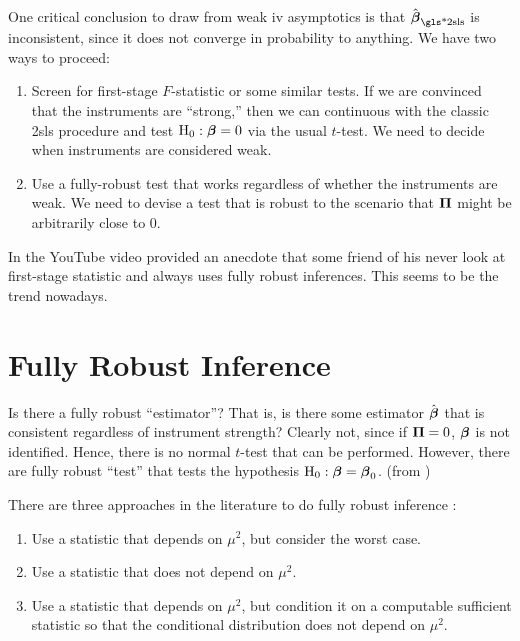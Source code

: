 \documentclass[a4paper]{article}
\begin{document}
\begin{remark}
	One critical conclusion to draw from weak \gls*{iv} asymptotics is that
	$\hat\bbeta_{\text{\gls*{2sls}}}$ is inconsistent, since
	it does not converge in probability to anything.
	We have two ways to proceed:
	\begin{enumerate}
		\item
			Screen for first-stage $F$-statistic or some similar tests.
			If we are convinced that the instruments are ``strong,''
			then we can continuous with the classic \gls*{2sls} procedure
			and test $\mathrm{H}_0:\boldsymbol{\beta}=0$ via the usual $t$-test.
			We need to decide when instruments are considered weak.
			\parencite{stock-yogo-2005}
		\item
			Use a fully-robust test that works regardless of whether the instruments are weak.
			We need to devise a test that is robust to the scenario that $\boldsymbol{\Pi}$ might be arbitrarily close to $0$.
	\end{enumerate}
	In the YouTube video \textcite{stock-2008} provided an anecdote
	that some friend of his never look at first-stage statistic and always uses fully robust inferences.
	This seems to be the trend nowadays.
\end{remark}

\section{Fully Robust Inference}

\begin{remark}
	Is there a fully robust ``estimator''?
	That is, is there some estimator $\hat{\boldsymbol{\beta}}$ that is consistent regardless of instrument strength?
	Clearly not, since if $\boldsymbol{\Pi}=0$, $\boldsymbol{\beta}$ is not identified.
	Hence, there is no normal $t$-test that can be performed.
	However, there are fully robust ``test'' that tests the hypothesis $\mathrm{H}_0:\boldsymbol{\beta}=\boldsymbol{\beta}_0$.
	(from \textcite{shi-2012})
\end{remark}

\noindent
There are three approaches in the literature to do fully robust inference \parencite{stock-2008}:

\begin{enumerate}[label = {A\arabic*.}]
	\item\label{item:attempt-1}
		Use a statistic that depends on $\mu^2$, but consider the worst case.
	\item\label{item:attempt-2}
		Use a statistic that does not depend on $\mu^2$.
	\item\label{item:attempt-3}
		Use a statistic that depends on $\mu^2$,
		but condition it on a computable sufficient statistic so that the conditional distribution does not depend on $\mu^2$.
\end{enumerate}
\end{document}

